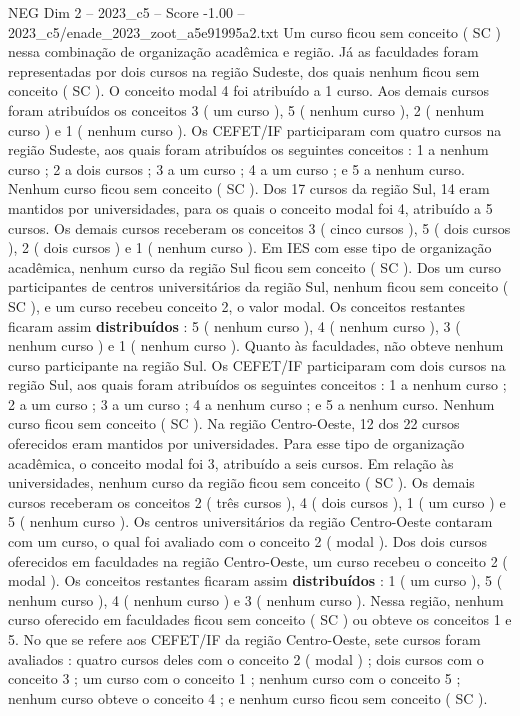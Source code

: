 \begin{textsample}{NEG Dim 2 – 2023\_c5 – Score -1.00 – 2023\_c5/enade\_2023\_zoot\_a5e91995a2.txt}
Um curso ficou sem conceito ( SC ) nessa combinação de organização acadêmica e região.
Já as faculdades foram representadas por dois cursos na região Sudeste, dos quais nenhum ficou sem conceito ( SC ).
O conceito modal 4 foi atribuído a 1 curso.
Aos demais cursos foram atribuídos os conceitos 3 ( um curso ), 5 ( nenhum curso ), 2 ( nenhum curso ) e 1 ( nenhum curso ).
Os CEFET/IF participaram com quatro cursos na região Sudeste, aos quais foram atribuídos os seguintes conceitos : 1 a nenhum curso ; 2 a dois cursos ; 3 a um curso ; 4 a um curso ; e 5 a nenhum curso.
Nenhum curso ficou sem conceito ( SC ).
Dos 17 cursos da região Sul, 14 eram mantidos por universidades, para os quais o conceito modal foi 4, atribuído a 5 cursos.
Os demais cursos receberam os conceitos 3 ( cinco cursos ), 5 ( dois cursos ), 2 ( dois cursos ) e 1 ( nenhum curso ).
Em IES com esse tipo de organização acadêmica, nenhum curso da região Sul ficou sem conceito ( SC ).
Dos um curso participantes de centros universitários da região Sul, nenhum ficou sem conceito ( SC ), e um curso recebeu conceito 2, o valor modal.
Os conceitos restantes ficaram assim \textbf{distribuídos} : 5 ( nenhum curso ), 4 ( nenhum curso ), 3 ( nenhum curso ) e 1 ( nenhum curso ).
Quanto às faculdades, não obteve nenhum curso participante na região Sul.
Os CEFET/IF participaram com dois cursos na região Sul, aos quais foram atribuídos os seguintes conceitos : 1 a nenhum curso ; 2 a um curso ; 3 a um curso ; 4 a nenhum curso ; e 5 a nenhum curso.
Nenhum curso ficou sem conceito ( SC ).
Na região Centro-Oeste, 12 dos 22 cursos oferecidos eram mantidos por universidades.
Para esse tipo de organização acadêmica, o conceito modal foi 3, atribuído a seis cursos.
Em relação às universidades, nenhum curso da região ficou sem conceito ( SC ).
Os demais cursos receberam os conceitos 2 ( três cursos ), 4 ( dois cursos ), 1 ( um curso ) e 5 ( nenhum curso ).
Os centros universitários da região Centro-Oeste contaram com um curso, o qual foi avaliado com o conceito 2 ( modal ).
Dos dois cursos oferecidos em faculdades na região Centro-Oeste, um curso recebeu o conceito 2 ( modal ).
Os conceitos restantes ficaram assim \textbf{distribuídos} : 1 ( um curso ), 5 ( nenhum curso ), 4 ( nenhum curso ) e 3 ( nenhum curso ).
Nessa região, nenhum curso oferecido em faculdades ficou sem conceito ( SC ) ou obteve os conceitos 1 e 5.
No que se refere aos CEFET/IF da região Centro-Oeste, sete cursos foram avaliados : quatro cursos deles com o conceito 2 ( modal ) ; dois cursos com o conceito 3 ; um curso com o conceito 1 ; nenhum curso com o conceito 5 ; nenhum curso obteve o conceito 4 ; e nenhum curso ficou sem conceito ( SC ).

\end{textsample}
